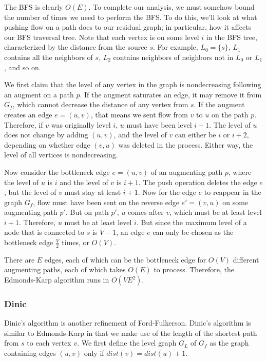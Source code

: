 The BFS is clearly $O(E)$. To complete our analysis, we must somehow bound the number of times we need to perform the BFS. To do this, we'll look at what pushing flow on a path does to our residual graph; in particular, how it affects our BFS traversal tree. Note that each vertex is on some level $i$ in the BFS tree, characterized by the distance from the source $s$. For example, $L_0 = \{s\}$, $L_1$ contains all the neighbors of $s$, $L_2$ contains neighbors of neighbors not in $L_0$ or $L_1$, and so on.

We first claim that the level of any vertex in the graph is nondecreasing following an augment on a path $p$. If the augment saturates an edge, it may remove it from $G_f$, which cannot decrease the distance of any vertex from $s$. If the augment creates an edge $e=(u,v)$, that means we sent flow from $v$ to $u$ on the path $p$. Therefore, if $v$ was originally level $i$, $u$ must have been level $i+1$. The level of $u$ does not change by adding $(u,v)$, and the level of $v$ can either be $i$ or $i+2$, depending on whether edge $(v,u)$ was deleted in the process. Either way, the level of all vertices is nondecreasing.

Now consider the bottleneck edge $e=(u,v)$ of an augmenting path $p$, where the level of $u$ is $i$ and the level of $v$ is $i+1$. The push operation deletes the edge $e$, but the level of $v$ must stay at least $i+1$. Now for the edge $e$ to reappear in the graph $G_f$, flow must have been sent on the reverse edge $e'=(v,u)$ on some augmenting path $p'$. But on path $p'$, $u$ comes after $v$, which must be at least level $i+1$. Therefore, $u$ must be at least level $i$. But since the maximum level of a node that is connected to $s$ is $V-1$, an edge $e$ can only be chosen as the bottleneck edge $\frac{V}{2}$ times, or $O(V)$.

There are $E$ edges, each of which can be the bottleneck edge for $O(V)$ different augmenting paths, each of which takes $O(E)$ to process. Therefore, the Edmonds-Karp algorithm runs in $O(VE^2)$.

\subsubsection{Dinic}

Dinic's algorithm is another refinement of Ford-Fulkerson. Dinic's algorithm is similar to Edmonds-Karp in that we make use of the length of the shortest path from $s$ to each vertex $v$. We first define the level graph $G_L$ of $G_f$ as the graph containing edges $(u,v)$ only if $dist(v) = dist(u) + 1$.

